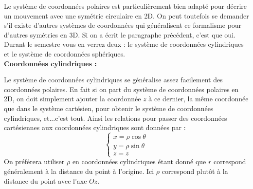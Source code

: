 \documentclass{article}
\begin{document}
Le système de coordonnées polaires est particulièrement bien adapté pour décrire un mouvement avec une symétrie circulaire en 2D. On peut toutefois se demander s'il existe d'autres systèmes de coordonnées qui généralisent ce formalisme pour d'autres symétries en 3D. Si on a écrit le paragraphe précédent, c'est que oui. Durant le semestre vous en verrez deux : le système de coordonnées cylindriques et le système de coordonnées sphériques. \\
\noindent\textbf{Coordonnées cylindriques :}\\
\begin{center}
\end{center}
Le système de coordonnées cylindriques se généralise assez facilement des coordonnées polaires. En fait si on part du système de coordonnées polaires en 2D, on doit simplement ajouter la coordonnée $z$ à ce dernier, la même coordonnée que dans le système cartésien, pour obtenir le système de coordonnées cylindriques, et...c'est tout.
Ainsi les relations pour passer des coordonnées cartésiennes aux coordonnées cylindriques sont données par : 
\begin{equation*}    
\begin{cases} x = \rho\cos{\theta} \\
y = \rho\sin{\theta} \\
z = z
\end{cases}
\end{equation*}
On préférera utiliser $\rho$ en coordonnées cylindriques étant donné que $r$ correspond généralement à la distance du point à l'origine. Ici $\rho$ correspond plutôt à la distance du point avec l'axe $Oz$.
\end{document}
